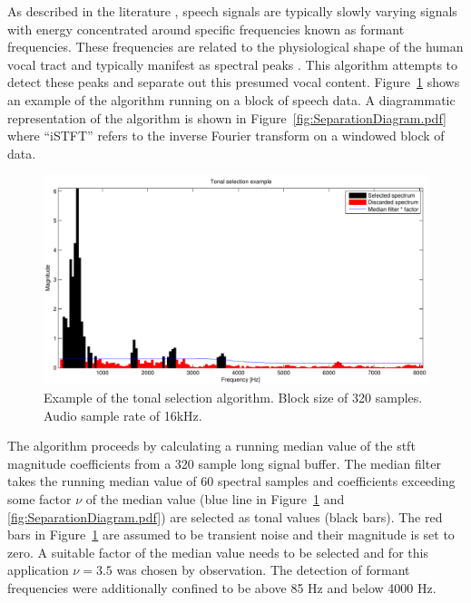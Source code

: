 As described in the literature \cite{Vaseghi1988thesis}\cite{Vaseghi1990}, speech signals are typically slowly varying signals with energy concentrated around specific frequencies known as formant frequencies. These frequencies are related to the physiological shape of the human vocal tract and typically manifest as spectral peaks \cite{Fant1970}. This algorithm attempts to detect these peaks and separate out this presumed vocal content. Figure~\ref{fig:Separation_Spectrum_Selection.pdf} shows an example of the algorithm running on a block of speech data. A diagrammatic representation of the algorithm is shown in Figure~\ref{fig:SeparationDiagram.pdf} where ``iSTFT'' refers to the inverse Fourier transform on a windowed block of data.

\begin{figure} %
\begin{minipage}[b]{1.0\linewidth}
  \centering
  \centerline{\includegraphics[width=14cm]{Separation_Spectrum_Selection.pdf}}
\end{minipage}
\caption{Example of the tonal selection algorithm. Block size of 320 samples. Audio sample rate of 16kHz.}
\label{fig:Separation_Spectrum_Selection.pdf}
\end{figure}

The algorithm proceeds by calculating a running median value of the \gls{stft} magnitude coefficients from a 320 sample long signal buffer. The median filter takes the running median value of 60 spectral samples and coefficients exceeding some factor $\nu$ of the median value (blue line in Figure~\ref{fig:Separation_Spectrum_Selection.pdf} and \ref{fig:SeparationDiagram.pdf}) are selected as tonal values (black bars). The red bars in Figure~\ref{fig:Separation_Spectrum_Selection.pdf} are assumed to be transient noise and their magnitude is set to zero. A suitable factor of the median value needs to be selected and for this application $\nu = 3.5$ was chosen by observation. The detection of formant frequencies were additionally confined to be above 85 Hz and below 4000 Hz.

